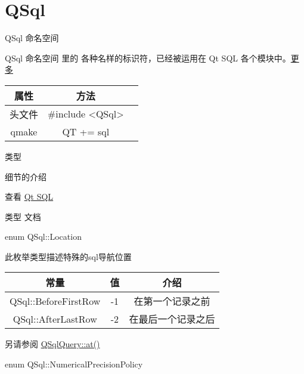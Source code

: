 \chapter{QSql}
QSql 命名空间

QSql 命名空间 里的 各种名样的标识符，已经被运用在 Qt SQL 各个模块中。\href{https://doc.qt.io/qt-5/qsql.html#details}{更多} 

\begin{tabular}{|c|c|p{1.5cm}|}
	\hline
	属性 & 方法 \\
	\hline
	头文件 & \#include <QSql>\\      
	\hline
	qmake & QT += sql\\      
	\hline
\end{tabular}

类型



细节的介绍 

查看 \href{https://doc.qt.io/qt-5/qtsql-index.html}{Qt SQL}

类型 文档

enum QSql::Location


此枚举类型描述特殊的sql导航位置


\begin{tabular}{|c|c|c|}
	\hline
	常量	& 值 & 介绍 \\
	\hline
	QSql::BeforeFirstRow&-1&在第一个记录之前\\
	\hline
	QSql::AfterLastRow&-2&在最后一个记录之后\\
	\hline
\end{tabular}

另请参阅 \href{https://doc.qt.io/qt-5/qsqlquery.html#at}{QSqlQuery::at()}

enum QSql::NumericalPrecisionPolicy


